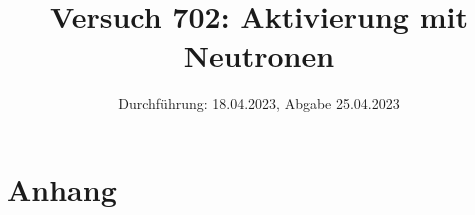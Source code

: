 

\title{Versuch 702: Aktivierung mit Neutronen}
\date{Durchführung: 18.04.2023, Abgabe 25.04.2023}


\maketitle
\thispagestyle{empty} 
\tableofcontents
\newpage
\setcounter{page}{1}






\printbibliography
\newpage

\section*{Anhang}

%

